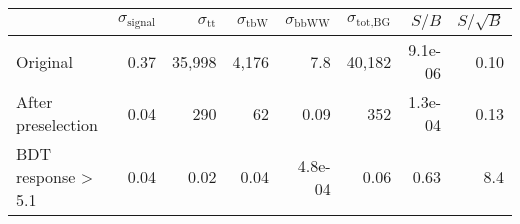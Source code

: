 \begin{tabular}{lrrrrrrr}
\toprule
{} &  $\sigma_\text{signal}$ &  $\sigma_\text{tt}$ &  $\sigma_\text{tbW}$ &  $\sigma_\text{bbWW}$ &  $\sigma_\text{tot,BG}$ &   $S/B$ &  $S/\sqrt{B}$ \\
\midrule
Original           &               0.37 &          35,998 &           4,176 &              7.8 &             40,182 & 9.1e-06 &          0.10 \\
After preselection &               0.04 &             290 &              62 &             0.09 &                352 & 1.3e-04 &          0.13 \\
BDT response > 5.1      &               0.04 &            0.02 &            0.04 &          4.8e-04 &               0.06 &    0.63 &           8.4 \\
\bottomrule
\end{tabular}
